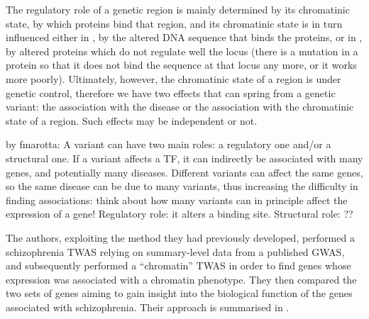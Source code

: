\documentclass[../main.tex]{subfiles}
\begin{document}
The regulatory role of a genetic region is mainly determined by its 
chromatinic state, \ie by which proteins bind that region, and its 
chromatinic state is in turn influenced either in \cis, by the altered 
DNA sequence that binds the proteins, or in \trans, by altered proteins 
which do not regulate well the locus (\ie there is a mutation in a 
protein so that it does not bind the sequence at that locus any more, or 
it works more poorly). Ultimately, however, the chromatinic state of a 
region is under genetic control, therefore we have two effects that can 
spring from a genetic variant: the association with the disease or the 
association with the chromatinic state of a region. Such effects may be 
independent or not.

by fmarotta: A variant can have two main roles: a regulatory one and/or 
a structural one. If a variant affects a TF, it can indirectly be 
associated with many genes, and potentially many diseases. Different 
variants can affect the same genes, so the same disease can be due to 
many variants, thus increasing the difficulty in finding associations: 
think about how many variants can in principle affect the expression of 
a gene! Regulatory role: it alters a binding site. Structural role: ??

The authors, exploiting the method they had previously developed, 
performed a schizophrenia TWAS relying on summary-level data from a 
published GWAS, and subsequently performed a \enquote{chromatin} TWAS in 
order to find genes whose expression was associated with a chromatin 
phenotype. 
They then compared the two sets of genes aiming to gain insight into the 
biological function of the genes associated with schizophrenia. Their 
approach is summarised in .
\end{document}
